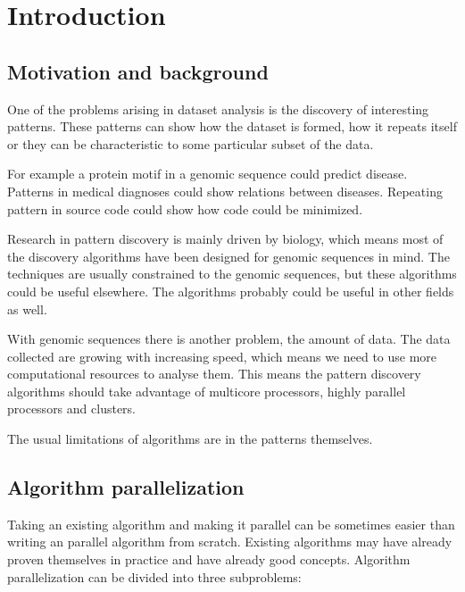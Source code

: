 \chapter{Introduction}
\label{c:introduction}

\section{Motivation and background}

One of the problems arising in dataset analysis is the discovery of interesting patterns. These patterns can show how the dataset is formed, how it repeats itself or they can be characteristic to some particular subset of the data.

For example a protein motif in a genomic sequence could predict disease. Patterns in medical diagnoses could show relations between diseases. Repeating pattern in source code could show how code could be minimized.

Research in pattern discovery is mainly driven by biology, which means most of the discovery algorithms have been designed for genomic sequences in mind. The techniques are usually constrained to the genomic sequences, but these algorithms could be useful elsewhere. The algorithms probably could be useful in other fields as well.

With genomic sequences there is another problem, the amount of data\cite{HowIsGenomeDoing}. The data collected are growing with increasing speed, which means we need to use more computational resources to analyse them. This means the pattern discovery algorithms should take advantage of multicore processors, highly parallel processors and clusters.



The usual limitations of algorithms are in the patterns themselves.


\section{Algorithm parallelization}

Taking an existing algorithm and making it parallel can be sometimes easier than writing an parallel algorithm from scratch. Existing algorithms may have already proven themselves in practice and have already good concepts. Algorithm parallelization can be divided into three subproblems:

